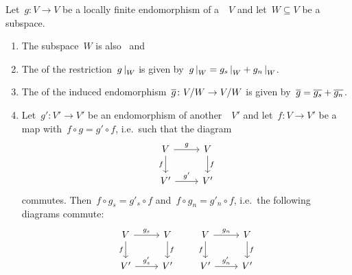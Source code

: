\begin{lemma}
  \label{properties of local jcd}
  Let~$g \colon V \to V$ be a locally finite endomorphism of a~{\kvs}~$V$ and let~$W \subseteq V$ be a~ subspace.
  \begin{enumerate}
    \item
      The subspace~$W$ is also~ and~
    \item
      \label{restriction of local jcd}
      The {\JCD} of the restriction~$\restrict{g}{W}$ is given by~$\restrict{g}{W} = \restrict{g_s}{W} + \restrict{g_n}{W}$.
    \item
      \label{induced local jcd}
      The {\JCD} of the induced endomorphism~$\overline{g} \colon V/W \to V/W$ is given by~$\overline{g} = \overline{g_s} + \overline{g_n}$.
    \item
      Let~$g' \colon V' \to V'$ be an endomorphism of another~{\kvs}~$V'$ and let~$f \colon V \to V'$ be a~ map with~$f \circ g = g' \circ f$, i.e.\ such that the diagram
      \[
        \begin{tikzcd}
            V
            \arrow{r}[above]{g}
            \arrow{d}[left]{f}
          & V
            \arrow{d}[right]{f}
          \\
            V'
            \arrow{r}[above]{g'}
          & V'
        \end{tikzcd}
      \]
      commutes.
      Then~$f \circ g_s = g'_s \circ f$ and~$f \circ g_n = g'_n \circ f$, i.e.\ the following diagrams commute:
      \[
        \begin{tikzcd}
            V
            \arrow{r}[above]{g_s}
            \arrow{d}[left]{f}
          & V
            \arrow{d}[right]{f}
          \\
            V'
            \arrow{r}[above]{g'_s}
          & V'
        \end{tikzcd}
        \qquad
        \begin{tikzcd}
            V
            \arrow{r}[above]{g_n}
            \arrow{d}[left]{f}
          & V
            \arrow{d}[right]{f}
          \\
            V'
            \arrow{r}[above]{g'_n}
          & V'
        \end{tikzcd}
      \]
  \end{enumerate}
\end{lemma}


